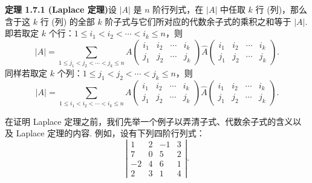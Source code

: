 \documentclass[UTF8, 12pt, fontset=fandol, oneside]{ctexart}
\begin{document}
\noindent\textbf{定理 1.7.1 (Laplace 定理)}\quad 设 $|A|$ 是 $n$ 阶行列式，在 $|A|$ 中任取 $k$ 行 (列)，那么含于这 $k$ 行 (列) 的全部 $k$ 阶子式与它们所对应的代数余子式的乘积之和等于 $|A|$. 即若取定 $k$ 个行：$1\le i_1<i_2<\cdots<i_k\le n$，则
\begin{equation}
|A|=
\sum_{1\le j_1<j_2<\cdots<j_k\le n}
A\left(\begin{array}{cccc}
i_1 & i_2 & \cdots & i_k\\
j_1 & j_2 & \cdots & j_k
\end{array}\right)
\widehat{A}\left(\begin{array}{cccc}
i_1 & i_2 & \cdots & i_k\\
j_1 & j_2 & \cdots & j_k
\end{array}\right).
\tag{1.7.4}
\end{equation}
同样若取定 $k$ 个列：$1\le j_1<j_2<\cdots<j_k\le n$，则
\begin{equation}
|A|=
\sum_{1\le i_1<i_2<\cdots<i_k\le n}
A\left(\begin{array}{cccc}
i_1 & i_2 & \cdots & i_k\\
j_1 & j_2 & \cdots & j_k
\end{array}\right)
\widehat{A}\left(\begin{array}{cccc}
i_1 & i_2 & \cdots & i_k\\
j_1 & j_2 & \cdots & j_k
\end{array}\right).
\tag{1.7.5}
\end{equation}

在证明 Laplace 定理之前，我们先举一个例子以弄清子式、代数余子式的含义以及 Laplace 定理的内容. 例如，设有下列四阶行列式：
\[
\left|\begin{array}{rrrr}
1 & 2 & -1 & 3\\
7 & 0 & 5 & 2\\
-2 & 4 & 6 & 1\\
2 & 3 & 1 & 4
\end{array}\right|.
\]
\end{document}
